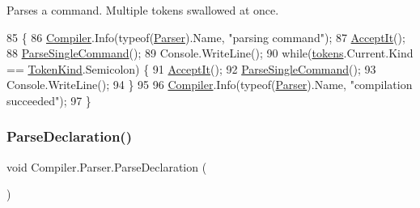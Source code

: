Parses a command. Multiple tokens swallowed at once. 
\begin{DoxyCode}
85                                                   \{
86                         \mbox{\hyperlink{namespace_compiler}{Compiler}}.Info(typeof(\mbox{\hyperlink{class_compiler_1_1_parser_a450e11452db3f91ff866fc1e36ebc79d}{Parser}}).Name, \textcolor{stringliteral}{"parsing command"});
87                         \mbox{\hyperlink{class_compiler_1_1_parser_ae19e507e1e2460cbad35b03d24402b4f}{AcceptIt}}();
88                         \mbox{\hyperlink{class_compiler_1_1_parser_af315f582be84f8e1b37add91efa3afc0}{ParseSingleCommand}}();
89                         Console.WriteLine();
90                         \textcolor{keywordflow}{while}(\mbox{\hyperlink{class_compiler_1_1_parser_a4db075175c853a197c7b8db7d787a0a5}{tokens}}.Current.Kind == \mbox{\hyperlink{namespace_compiler_a57929962f25004759596fc3f13cf563c}{TokenKind}}.Semicolon) \{
91                             \mbox{\hyperlink{class_compiler_1_1_parser_ae19e507e1e2460cbad35b03d24402b4f}{AcceptIt}}();
92                             \mbox{\hyperlink{class_compiler_1_1_parser_af315f582be84f8e1b37add91efa3afc0}{ParseSingleCommand}}();
93                             Console.WriteLine();
94                         \}
95 
96                         \mbox{\hyperlink{namespace_compiler}{Compiler}}.Info(typeof(\mbox{\hyperlink{class_compiler_1_1_parser_a450e11452db3f91ff866fc1e36ebc79d}{Parser}}).Name, \textcolor{stringliteral}{"compilation succeeded"});
97                     \}
\end{DoxyCode}
\mbox{\label{class_compiler_1_1_parser_ab9718b82a785e63b848e51c39bbe8ee7}} 
\subsubsection{\texorpdfstring{Parse\+Declaration()}{ParseDeclaration()}}
{\footnotesize\ttfamily void Compiler.\+Parser.\+Parse\+Declaration (\begin{DoxyParamCaption}{ }\end{DoxyParamCaption})\hspace{0.3cm}{\ttfamily [protected]}}

